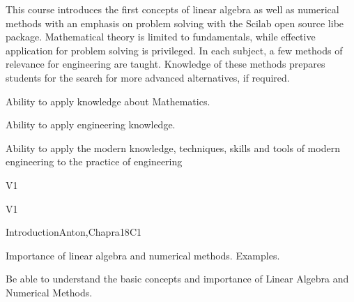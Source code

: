 \begin{syllabus}


\begin{justification}
This course introduces the first concepts of linear algebra as well as numerical methods with an emphasis on problem solving with the Scilab open source libe package.
Mathematical theory is limited to fundamentals, while effective application for problem solving is privileged.
In each subject, a few methods of relevance for engineering are taught. Knowledge of these methods prepares students for the search for more advanced alternatives, if required.

\end{justification}

\begin{goals}
\item Ability to apply knowledge about Mathematics.
\item Ability to apply engineering knowledge.
\item Ability to apply the modern knowledge, techniques, skills and tools of modern engineering to the practice of engineering

\end{goals}

\begin{outcomes}{V1}
    \item {}
    \item {}
\end{outcomes}

\begin{competences}{V1}
    \item {} 
    \item {} 
    \item {} 
\end{competences}

\begin{unit}{Introduction}{}{Anton,Chapra}{18}{C1}

  \begin{topics}
      \item Importance of linear algebra and numerical methods. Examples.
   \end{topics}

   \begin{learningoutcomes}
      \item Be able to understand the basic concepts and importance of Linear Algebra and Numerical Methods.
   \end{learningoutcomes}
\end{unit}


\end{syllabus}
